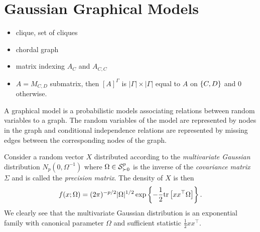 \part{Gaussian Graphical Models}

\begin{itemize}
    \item clique, set of cliques
    \item chordal graph
    \item matrix indexing $A_C$ and $A_{C, C}$
    \item $A = M_{C, D}$ submatrix, then $[A]^\Gamma$ is $|\Gamma| \times |\Gamma|$ equal to $A$ on $\eset{C, D}$ and 0 otherwise.
\end{itemize}


A graphical model is a probabilistic models associating relations between random variables to a graph. The random variables of the model are represented by nodes in the graph and conditional independence relations are represented by missing edges between the corresponding nodes of the graph.

Consider a random vector $X$ distributed according to the \textit{multivariate Gaussian} distribution $N_p(0, \Omega^{-1})$ where $\Omega \in \S^p_{\succ 0}$ is the inverse of the \textit{covariance matrix} $\Sigma$ and is called the \textit{precision matrix}. The density of $X$ is then
\begin{equation} \label{eq-density-gaussian}
    f(x; \Omega) = (2\pi)^{-p/2} |\Omega|^{1/2} \expfc{-\frac{1}{2} \trB{xx^\top \Omega} }.
\end{equation}
We clearly see that the multivariate Gaussian distribution is an exponential family with canonical parameter $\Omega$ and sufficient statistic $\frac{1}{2}xx^\top$. 

